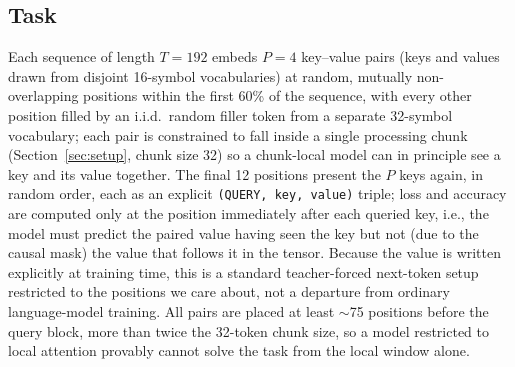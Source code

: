 \documentclass[11pt]{article}
\begin{document}
\subsection{Task}
Each sequence of length $T{=}192$ embeds $P{=}4$ key--value pairs (keys and values drawn from
disjoint 16-symbol vocabularies) at random, mutually non-overlapping positions within the first
60\% of the sequence, with every other position filled by an i.i.d.\ random filler token from a
separate 32-symbol vocabulary; each pair is constrained to fall inside a single processing chunk
(Section~\ref{sec:setup}, chunk size 32) so a chunk-local model can in principle see a key and
its value together. The final 12 positions present the $P$ keys again, in random order, each as
an explicit \texttt{(QUERY, key, value)} triple; loss and accuracy are computed only at the
position immediately after each queried key, i.e., the model must predict the paired value
having seen the key but not (due to the causal mask) the value that follows it in the tensor.
Because the value is written explicitly at training time, this is a standard teacher-forced
next-token setup restricted to the positions we care about, not a departure from ordinary
language-model training. All pairs are placed at least $\sim$75 positions before the query
block, more than twice the 32-token chunk size, so a model restricted to local attention
provably cannot solve the task from the local window alone.
\end{document}
